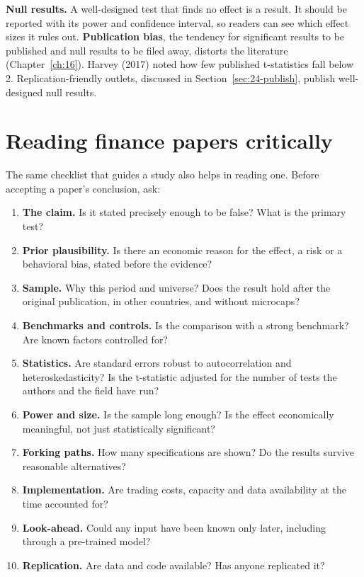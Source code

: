 \textbf{Null results.} A well-designed test that finds no effect is a result. It should be reported with its power and confidence interval, so readers can see which effect sizes it rules out. \textbf{Publication bias}, the tendency for significant results to be published and null results to be filed away, distorts the literature (Chapter~\ref{ch:16}). Harvey (2017) noted how few published t-statistics fall below 2. Replication-friendly outlets, discussed in Section~\ref{sec:24-publish}, publish well-designed null results.

\section{Reading finance papers critically}
\label{sec:24-reading}

The same checklist that guides a study also helps in reading one. Before accepting a paper's conclusion, ask:

\begin{enumerate}
  \item \textbf{The claim.} Is it stated precisely enough to be false? What is the primary test?
  \item \textbf{Prior plausibility.} Is there an economic reason for the effect, a risk or a behavioral bias, stated before the evidence?
  \item \textbf{Sample.} Why this period and universe? Does the result hold after the original publication, in other countries, and without microcaps?
  \item \textbf{Benchmarks and controls.} Is the comparison with a strong benchmark? Are known factors controlled for?
  \item \textbf{Statistics.} Are standard errors robust to autocorrelation and heteroskedasticity? Is the t-statistic adjusted for the number of tests the authors and the field have run?
  \item \textbf{Power and size.} Is the sample long enough? Is the effect economically meaningful, not just statistically significant?
  \item \textbf{Forking paths.} How many specifications are shown? Do the results survive reasonable alternatives?
  \item \textbf{Implementation.} Are trading costs, capacity and data availability at the time accounted for?
  \item \textbf{Look-ahead.} Could any input have been known only later, including through a pre-trained model?
  \item \textbf{Replication.} Are data and code available? Has anyone replicated it?
\end{enumerate}

